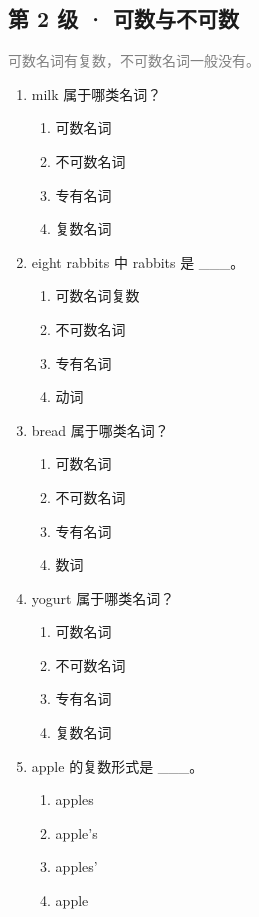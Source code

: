\documentclass[11pt,a4paper]{ctexart}
\begin{document}
\subsection*{第 2 级 · 可数与不可数}
\noindent\textcolor{gray}{可数名词有复数，不可数名词一般没有。}\par\smallskip
\begin{enumerate}[leftmargin=*,itemsep=4pt]
\item milk 属于哪类名词？
\begin{enumerate}[label=\Alph*.,leftmargin=2em,itemsep=1pt,topsep=2pt]
\item 可数名词
\item 不可数名词
\item 专有名词
\item 复数名词
\end{enumerate}
\item eight rabbits 中 rabbits 是 \_\_\_。
\begin{enumerate}[label=\Alph*.,leftmargin=2em,itemsep=1pt,topsep=2pt]
\item 可数名词复数
\item 不可数名词
\item 专有名词
\item 动词
\end{enumerate}
\item bread 属于哪类名词？
\begin{enumerate}[label=\Alph*.,leftmargin=2em,itemsep=1pt,topsep=2pt]
\item 可数名词
\item 不可数名词
\item 专有名词
\item 数词
\end{enumerate}
\item yogurt 属于哪类名词？
\begin{enumerate}[label=\Alph*.,leftmargin=2em,itemsep=1pt,topsep=2pt]
\item 可数名词
\item 不可数名词
\item 专有名词
\item 复数名词
\end{enumerate}
\item apple 的复数形式是 \_\_\_。
\begin{enumerate}[label=\Alph*.,leftmargin=2em,itemsep=1pt,topsep=2pt]
\item apples
\item apple’s
\item apples’
\item apple

\end{enumerate}
\end{enumerate}
\end{document}
